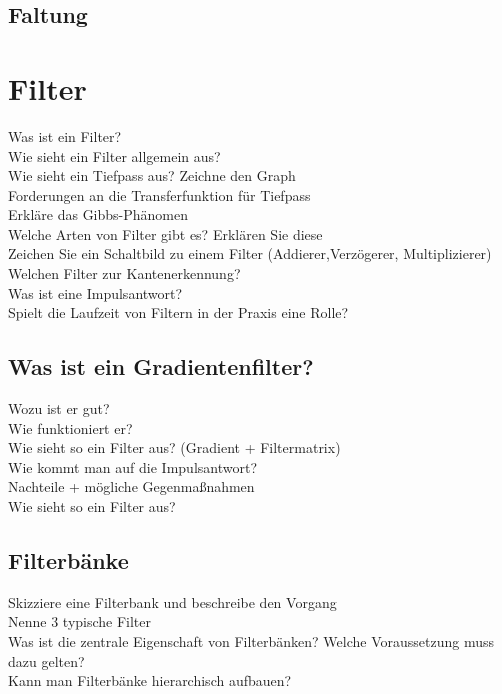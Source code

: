 \subsection{Faltung}

\section{Filter}
\begin{description}
	\item[Was ist ein Filter?]
	\item[Wie sieht ein Filter allgemein aus?]
	\item[Wie sieht ein Tiefpass aus? Zeichne den Graph]
	\item[Forderungen an die Transferfunktion für Tiefpass]
	\item[Erkläre das Gibbs-Phänomen]
	\item[Welche Arten von Filter gibt es? Erklären Sie diese]
	\item[Zeichen Sie ein Schaltbild zu einem Filter (Addierer,Verzögerer, Multiplizierer)]
	\item[Welchen Filter zur Kantenerkennung?]
	\item[Was ist eine Impulsantwort?]
	\item[Spielt die Laufzeit von Filtern in der Praxis eine Rolle?]
\end{description}
\subsection{Was ist ein Gradientenfilter?}
\begin{description}
	\item[Wozu ist er gut?]
	\item[Wie funktioniert er?]
	\item[Wie sieht so ein Filter aus? (Gradient + Filtermatrix)]
	\item[Wie kommt man auf die Impulsantwort?]
	\item[Nachteile + mögliche Gegenmaßnahmen]
	\item[Wie sieht so ein Filter aus?]
\end{description}
\subsection{Filterbänke}
\begin{description}
	\item[Skizziere eine Filterbank und beschreibe den Vorgang]
	\item[Nenne 3 typische Filter]
	\item[Was ist die zentrale Eigenschaft von Filterbänken? Welche Voraussetzung muss dazu gelten?]
	\item[Kann man Filterbänke hierarchisch aufbauen?]
\end{description}
